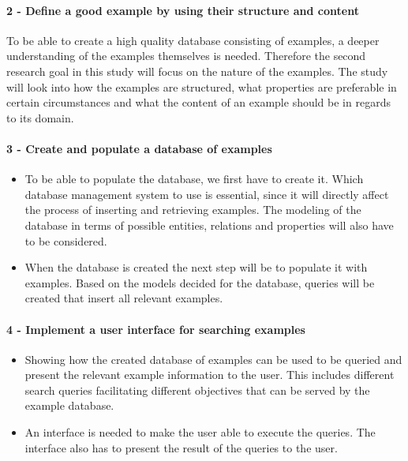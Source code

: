 \paragraph{2 - Define a good example by using their structure and content}
To be able to create a high quality database consisting of examples, a deeper understanding of the examples themselves is needed. Therefore the second research goal in this study will focus on the nature of the examples. The study will look into how the examples are structured, what properties are preferable in certain circumstances and what the content of an example should be in regards to its domain. 

\paragraph{3 - Create and populate a database of examples}
\begin{itemize}
    \item To be able to populate the database, we first have to create it. Which database management system to use is essential, since it will directly affect the process of inserting and retrieving examples. The modeling of the database in terms of possible entities, relations and properties will also have to be considered.
    \item When the database is created the next step will be to populate it with examples. Based on the models decided for the database, queries will be created that insert all relevant examples.
\end{itemize}


\paragraph{4 - Implement a user interface for searching examples }
\begin{itemize}
    \item Showing how the created database of examples can be used to be queried and present the relevant example information to the user. This includes different search queries facilitating different objectives that can be served by the example database.
    \item An interface is needed to make the user able to execute the queries. The interface also has to present the result of the queries to the user.
\end{itemize}


